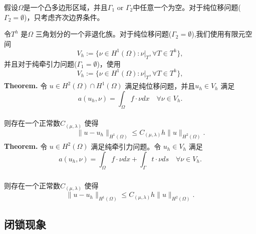 \documentclass[a4paper,UTF8,titlepage]{ctexart}
\begin{document}
假设$\Omega$是一个凸多边形区域，并且$\Gamma_1$ or $\Gamma_2$中任意一个为空。对于纯位移问题($\Gamma_2=\emptyset$)，只考虑齐次边界条件。
\par
令$T^h$ 是$\Omega$ 三角划分的一个非退化族。对于纯位移问题($\Gamma_2=\emptyset$),我们使用有限元空间
$$
V_h := \{ \nu \in H^1(\Omega) : \nu |_{T} , \forall T \in T^h \},
$$
并且对于纯牵引力问题($\Gamma_1 = \emptyset$)，使用
	$$
	V_h := \{ \nu \in H^1(\Omega) : \nu |_{T} , \forall T \in T^h \},
	$$
	\textbf{Theorem\textsuperscript{\cite{brenner2008mathematical}}.} 令 $u \in H^2(\Omega) \cap H^1(\Omega)$ 满足纯位移问题，并且$u_h \in V_h$ 满足
	$$
	a(u_h, \nu) = \int_{\Omega} f \cdot \nu dx \quad \forall \nu \in V_h.
	$$
	\\
	则存在一个正常数$C_{(\mu, \lambda)}$ 使得
	$$
	\quad \quad \quad
	\| u - u_h \|_{H^1(\Omega)} \le C_{(\mu, \lambda)} h \| u \|_{H^2(\Omega)}.
	$$
	\textbf{Theorem\textsuperscript{\cite{brenner2008mathematical}}.} 令 $u \in H^2(\Omega)$ 满足纯牵引力问题。令 $u_h \in V_h$ 满足
	$$
	a(u_h,\nu) = \int_{\Omega} f \cdot \nu dx + \int_{\Gamma} t \cdot \nu ds \quad \forall \nu \in V_h.
	$$ 
	\\
	则存在一个正常数$C_{(\mu, \lambda)}$ 使得\textsuperscript{\cite{brenner2008mathematical}}
	$$
	\| u - u_h \|_{H^1(\Omega)} \le C_{(\mu, \lambda)} h \| u \|_{H^2(\Omega)}.
	$$

\subsection{闭锁现象}
\end{document}
